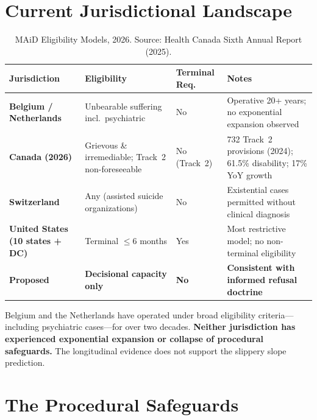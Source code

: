 \documentclass[11pt, letterpaper]{article}
\begin{document}
\section{Current Jurisdictional Landscape}

\begin{table}[h!]
\centering
\small
\renewcommand{\arraystretch}{1.45}
\begin{tabularx}{\textwidth}{>{\bfseries\sffamily\small}p{2.6cm} X >{\centering\arraybackslash}p{1.6cm} X}
\toprule
\rowcolor{C@accent}
{\color{white}\sffamily\bfseries Jurisdiction} &
{\color{white}\sffamily\bfseries Eligibility} &
{\color{white}\sffamily\bfseries Terminal Req.} &
{\color{white}\sffamily\bfseries Notes} \\
\midrule
Belgium / Netherlands
  & Unbearable suffering incl.\ psychiatric & No
  & Operative 20+ years; no exponential expansion observed \\
\rowcolor{C@accentlight}
Canada (2026)
  & Grievous \& irremediable; Track~2 non-foreseeable & No (Track~2)
  & 732 Track~2 provisions (2024); 61.5\% disability; 17\% YoY growth \\
Switzerland
  & Any (assisted suicide organizations) & No
  & Existential cases permitted without clinical diagnosis \\
\rowcolor{C@accentlight}
United States (10 states + DC)
  & Terminal $\leq$6 months & Yes
  & Most restrictive model; no non-terminal eligibility \\
\textbf{Proposed}
  & \textbf{Decisional capacity only} & \textbf{No}
  & \textbf{Consistent with informed refusal doctrine} \\
\bottomrule
\end{tabularx}
\caption{MAiD Eligibility Models, 2026. Source: Health Canada Sixth Annual Report (2025).}
\end{table}

\begin{findingbox}[title={\sffamily\bfseries\small\color{C@accent} Key Data Point}]
Belgium and the Netherlands have operated under broad eligibility criteria---including
psychiatric cases---for over two decades. \textbf{Neither jurisdiction has experienced
exponential expansion or collapse of procedural safeguards.} The longitudinal evidence
does not support the slippery slope prediction.
\end{findingbox}

\section{The Procedural Safeguards}
\end{document}
